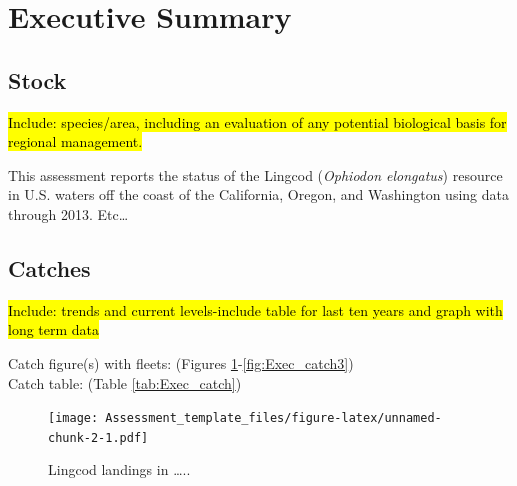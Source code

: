 \documentclass[12pt,]{article}
\begin{document}
\begin{center}
\vspace{.3cm}

\maketitle

\setcounter{page}{1}
\end{center}

{
\setcounter{tocdepth}{4}
\tableofcontents
}
\setlength{\parskip}{5mm plus1mm minus1mm} \pagebreak

 \setcounter{page}{1}
\renewcommand{\thefigure}{\alph{figure}}
\renewcommand{\thetable}{\alph{table}}

\section*{Executive Summary}\label{executive-summary}

\subsection*{Stock}\label{stock}

\hl{Include: species/area, including an evaluation of any potential biological basis 
for regional management.}

This assessment reports the status of the Lingcod
(\emph{Ophiodon elongatus}) resource in U.S. waters off the coast of the
California, Oregon, and Washington using data through 2013. Etc\ldots{}

\subsection*{Catches}\label{catches}

\hl{Include: trends and current levels-include table for last ten years and graph with 
long term data}

Catch figure(s) with fleets: (Figures
\ref{fig:Exec_catch1}-\ref{fig:Exec_catch3})\\
Catch table: (Table \ref{tab:Exec_catch})

\FloatBarrier

\begin{figure}[htbp]
\centering
\texttt{[image: Assessment\_template\_files/figure-latex/unnamed-chunk-2-1.pdf]}
\caption{Lingcod landings in \ldots{}.. \label{fig:Exec_catch1}}
\end{figure}
\end{document}
